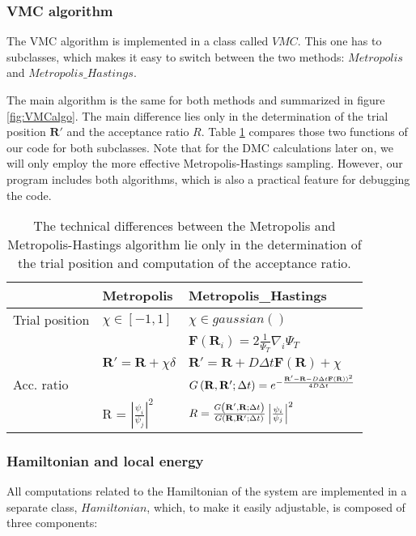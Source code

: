 \subsubsection{VMC algorithm}
The  VMC algorithm is implemented in a class called $VMC$. This one has to subclasses, which makes it easy to switch between the two methods: $Metropolis$ and $Metropolis\_Hastings$.


The main algorithm is the same for both methods and summarized in figure \ref{fig:VMCalgo}. The main difference lies only in the determination of the trial position $\mathbf{R}'$ and the acceptance ratio $R$. Table \ref{tab:algos} compares those two functions of our code for both subclasses. Note that for the DMC calculations later on, we will only employ the more effective Metropolis-Hastings sampling. However, our program includes both algorithms, which is also a practical feature for debugging the code.
\begin{table}
\begin{center}
\begin{tabular}{ l | l| l }
\hline\hline  & Metropolis & Metropolis\_Hastings \\
\hline Trial position & $\chi \in [-1,1]$ & $\chi \in gaussian()$  \\
 & & $\mathbf{F}(\mathbf{R}_i) = 2 \frac{1}{\Psi_T}\nabla_i \Psi_T$ \\
 & $\mathbf{R}' = \mathbf{R} +  \chi\delta$ &  $\mathbf{R}' = \mathbf{R} + D \Delta t\mathbf{F}\left(\mathbf{R}\right) + \chi$\\
\hline Acc. ratio & & $G\left(\mathbf{R},\mathbf{R}';\Delta t\right) = e^{-\frac{\mathbf{R} '-\mathbf{R} - D\Delta t \mathbf{F}(\mathbf{R}))^ 2}{4 D \Delta t}}$\\
& R = $\left|\frac{\psi_i}{\psi_j}\right|^2$ & $ R = \frac{G\left(\mathbf{R}',\mathbf{R};\Delta t\right)}{G\left(\mathbf{R},\mathbf{R}';\Delta t\right)}\left|\frac{\psi_i}{\psi_j}\right|^2 $\\
\hline\hline
\end{tabular}
\caption{The technical differences between the Metropolis and Metropolis-Hastings algorithm lie only in the determination of the trial position and computation of the acceptance ratio.}
\label{tab:algos}
\end{center}
\end{table}

\subsubsection{Hamiltonian and local energy}
All computations related to the Hamiltonian of the system are implemented in a separate class, $Hamiltonian$, which, to make it easily adjustable, is composed of three components: 

